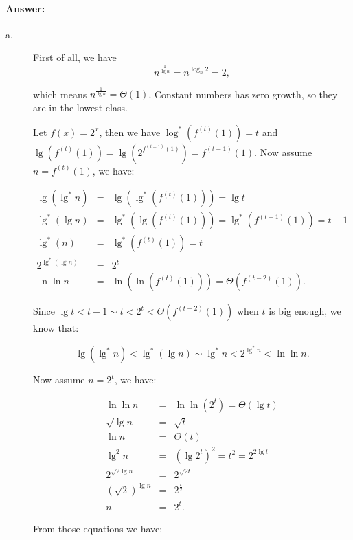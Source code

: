 \documentclass{article}
\newcommand{\answer}{\paragraph{Answer:}}
\begin{document}
\answer

\begin{description}

\item[a. \hspace{9pt}] First of all, we have 
$$n^{\frac{1}{\lg n}} = n^{\log_n{2}} = 2,$$

which means $n^{\frac{1}{\lg n}} = \Theta(1).$ Constant numbers has zero growth, so they are in the lowest class.

Let $f(x) = 2^x$, then we have $\log^*{\left(f^{(t)}(1)\right)} = t$ and $\lg\left(f^{(t)}(1)\right) = \lg\left(2^{f^{(t-1)}(1)}\right) = f^{(t-1)}(1)$. Now assume $n = f^{(t)}(1)$, we have:

\begin{eqnarray*}
\lg\left(\lg^*n\right) &=& \lg\left(\lg^*\left(f^{(t)}(1)\right)\right) = \lg t\\
\lg^*\left(\lg n\right) &=& \lg^*\left(\lg \left(f^{(t)}(1)\right)\right) = \lg^*\left(f^{(t-1)}(1)\right) = t-1\\
\lg^*(n) &=& \lg^*\left(f^{(t)}(1)\right) = t\\
2^{\lg^*\left(\lg n\right)} &=& 2^t\\
\ln\ln n &=& \ln \left(\ln \left(f^{(t)}(1)\right)\right) = \Theta\left(f^{(t - 2)}(1)\right).
\end{eqnarray*}

Since $\lg t < t - 1 \sim t < 2^t <\Theta\left(f^{(t - 2)}(1)\right)$ when $t$ is big enough, we know that:

\begin{equation}
\lg\left(\lg^*n\right) < \lg^*\left(\lg n\right) \sim \lg^*n < 2^{\lg^*n} < \ln \ln n.
\end{equation}

Now assume $n = 2^t$, we have:

\begin{eqnarray*}
\ln\ln n &=& \ln \ln \left(2^t\right) = \Theta\left(\lg t\right)\\
\sqrt{\lg n} &=& \sqrt{t}\\
\ln n &=& \Theta(t)\\
\lg^2{n} &=& \left(\lg2^t\right)^2 =  t^2 = 2^{2\lg t}\\
2^{\sqrt{2\lg n}} &=& 2^{\sqrt{2t}}\\
\left(\sqrt{2}\right)^{\lg n} &=& 2^{\frac{t}{2}}\\
n &=& 2^t.
\end{eqnarray*}

From those equations we have:


\end{description}
\end{document}
